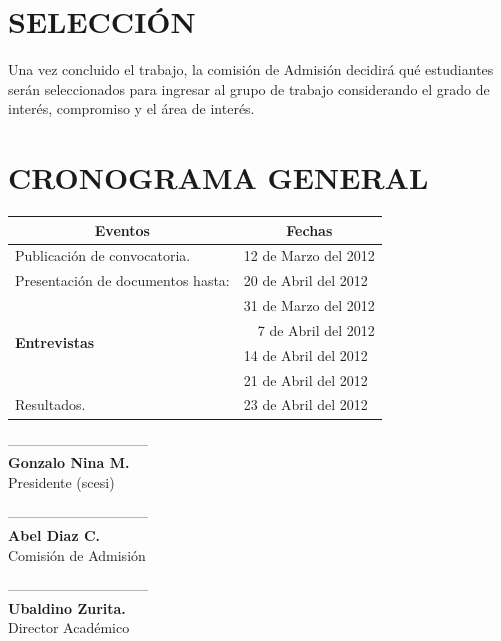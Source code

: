 \documentclass[11pt,letterpaper]{article}
\begin{document}
\section*{\bf \normalsize SELECCIÓN}
Una vez concluido el trabajo, la comisión de Admisión decidirá qué estudiantes serán seleccionados para ingresar al grupo de trabajo considerando el grado de interés, compromiso y el área  de interés.
\section*{\bf \normalsize CRONOGRAMA GENERAL}
\begin{center}
\begin{tabular}{|l|l|}
\hline
\multicolumn{1}{|c|}{\bf  Eventos} & \multicolumn{1}{c|}{\bf Fechas}\\
\hline
Publicación de convocatoria. & 12 de Marzo del 2012\\
\hline
Presentación de documentos hasta: & 20 de Abril del 2012\\
\hline
\multirow{4}{*}{\bf Entrevistas} & 31 de Marzo del 2012 \\
\cline{2-2}
& ~~7 de Abril del 2012\\
\cline{2-2}
& 14 de Abril del 2012\\
\cline{2-2}
& 21 de Abril del 2012\\
\hline
Resultados. & 23 de Abril del 2012\\
\hline
\end{tabular}
\end{center}
 \vspace{2.3cm}
\begin{minipage}{0.25\textwidth}
\begin{center}
------------------------------\\
{\bf Gonzalo Nina M.}\\
Presidente (scesi)\\
\end{center}
\end{minipage}
\begin{minipage}{0.47\textwidth}
\begin{center}
------------------------------\\
{\bf Abel Diaz C.}\\
Comisión de Admisión
\end{center}
\end{minipage}
\begin{minipage}{0.28\textwidth}

\begin{center}
------------------------------\\
{\bf Ubaldino Zurita.}\\
Director Académico\\
\end{center}
\end{minipage}
\end{document}
